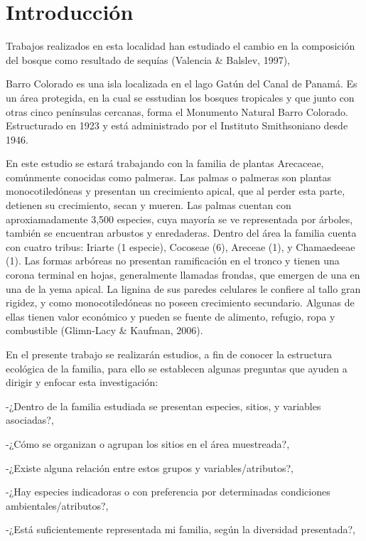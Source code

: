 \documentclass[11pt,]{article}
\begin{document}
\noindent  \section{Introducción}\label{introducciuxf3n}

Trabajos realizados en esta localidad han estudiado el cambio en la
composición del bosque como resultado de sequías (Valencia \& Balslev,
1997),

Barro Colorado es una isla localizada en el lago Gatún del Canal de
Panamá. Es un área protegida, en la cual se esstudian los bosques
tropicales y que junto con otras cinco penínsulas cercanas, forma el
Monumento Natural Barro Colorado. Estructurado en 1923 y está
administrado por el Instituto Smithsoniano desde 1946.

En este estudio se estará trabajando con la familia de plantas
Arecaceae, comúnmente conocidas como palmeras. Las palmas o palmeras son
plantas monocotiledóneas y presentan un crecimiento apical, que al
perder esta parte, detienen su crecimiento, secan y mueren. Las palmas
cuentan con aproxiamadamente 3,500 especies, cuya mayoría se ve
representada por árboles, también se encuentran arbustos y enredaderas.
Dentro del área la familia cuenta con cuatro tribus: Iriarte (1
especie), Cocoseae (6), Areceae (1), y Chamaedeeae (1). Las formas
arbóreas no presentan ramificación en el tronco y tienen una corona
terminal en hojas, generalmente llamadas frondas, que emergen de una en
una de la yema apical. La lignina de sus paredes celulares le confiere
al tallo gran rigidez, y como monocotiledóneas no poseen crecimiento
secundario. Algunas de ellas tienen valor económico y pueden se fuente
de alimento, refugio, ropa y combustible (Glimn-Lacy \& Kaufman, 2006).

En el presente trabajo se realizarán estudios, a fin de conocer la
estructura ecológica de la familia, para ello se establecen algunas
preguntas que ayuden a dirigir y enfocar esta investigación:

-¿Dentro de la familia estudiada se presentan especies, sitios, y
variables asociadas?,

-¿Cómo se organizan o agrupan los sitios en el área muestreada?,

-¿Existe alguna relación entre estos grupos y variables/atributos?,

-¿Hay especies indicadoras o con preferencia por determinadas
condiciones ambientales/atributos?,

-¿Está suficientemente representada mi familia, según la diversidad
presentada?,
\end{document}
